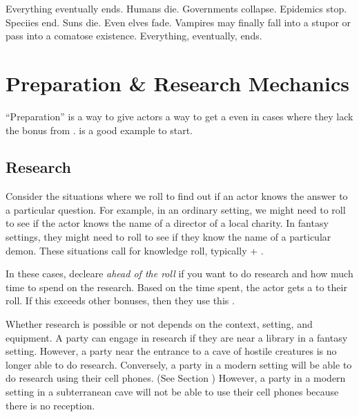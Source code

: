 Everything eventually ends. Humans die. Governments collapse. Epidemics stop. Speciies end. Suns die. Even elves fade.
Vampires may finally fall into a stupor or pass into a comatose existence. Everything, eventually, ends.


\section{Preparation \& Research Mechanics}

``Preparation'' is a way to give actors a way to get a 
even in cases where they lack the bonus from .
 is a good example to start.

\subsection{Research}
\label{subsec:research_mechanic}

\begin{marginNote}
	
\end{marginNote}

Consider the situations where we roll to find out if an actor knows the answer
to a particular question. For example, in an ordinary setting, we might need
to roll to see if the actor knows the name of a director of a local charity.
In fantasy settings, they might need to roll to see if they know the name of
a particular demon. These situations call for knowledge roll, typically
 + .

In these cases, decleare \emph{ahead of the roll} if you want to do research and how
much time to spend on the research. Based on the time spent, the actor gets a 
to their roll. If this  exceeds other bonuses, then they use this
.

Whether research is possible or not depends on the context, setting, and equipment.
A party can engage in research if they are near a library in a fantasy setting.
However, a party near the entrance to a cave of hostile creatures is no longer able to do research.
Conversely, a party in a modern setting will be able to do research using their cell phones. (See Section )
However, a party in a modern setting in a subterranean cave will not be able to use their cell phones because there is no reception.


